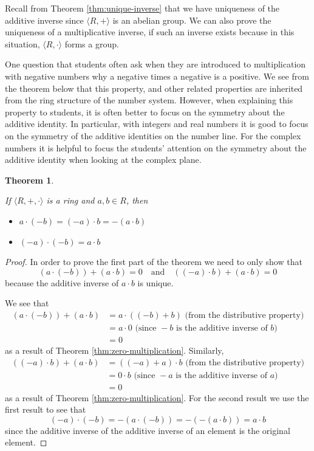 \documentclass[
]{book}
\newtheorem{theorem}{Theorem}[chapter]
\theoremstyle{definition}
\theoremstyle{definition}
\theoremstyle{definition}
\theoremstyle{definition}
\theoremstyle{remark}
\begin{document}
Recall from Theorem \ref{thm:unique-inverse} that we have uniqueness of the additive inverse since \(\langle R,+\rangle\) is an abelian group. We can also prove the uniqueness of a multiplicative inverse, if such an inverse exists because in this situation, \(\langle R,\cdot \rangle\) forms a group.

One question that students often ask when they are introduced to multiplication with negative numbers why a negative times a negative is a positive. We see from the theorem below that this property, and other related properties are inherited from the ring structure of the number system. However, when explaining this property to students, it is often better to focus on the symmetry about the additive identity. In particular, with integers and real numbers it is good to focus on the symmetry of the additive identities on the number line. For the complex numbers it is helpful to focus the students' attention on the symmetry about the additive identity when looking at the complex plane.

\begin{theorem}
\protect\hypertarget{thm:unlabeled-div-96}{}\label{thm:unlabeled-div-96}

If \(\langle R,+,\cdot\rangle\) is a ring and \(a,b \in R\), then

\begin{itemize}
\item
  \(a\cdot (-b)=(-a)\cdot b=-(a\cdot b)\)
\item
  \((-a)\cdot (-b)=a\cdot b\)
\end{itemize}

\end{theorem}

\begin{proof}

In order to prove the first part of the theorem we need to only show that
\[\left( a \cdot (-b) \right) + \left(a \cdot b\right) =0 \quad \mbox{and} \quad \left((-a)\cdot b\right)+\left(a \cdot b\right) =0\] because the additive inverse of \(a\cdot b\) is unique.

We see that
\begin{align*}
(a \cdot (-b)) + (a \cdot b ) &= a \cdot ((-b)+b) \mbox{ (from the distributive property)} \\
&= a \cdot 0 \mbox{ (since } -b \mbox{ is the additive inverse of }b)\\
&= 0
\end{align*}
as a result of Theorem \ref{thm:zero-multiplication}.
Similarly,
\begin{align*}
( (-a) \cdot b) + (a \cdot b) &= ((-a)+a)\cdot b \mbox{ (from the distributive property)} \\
&= 0 \cdot b \mbox{ (since } -a \mbox{ is the additive inverse of } a)\\
&= 0
\end{align*}
as a result of Theorem \ref{thm:zero-multiplication}.
For the second result we use the first result to see that
\[(-a)\cdot (-b) = -\left(a \cdot (-b)\right) = - \left( - \left(a\cdot b\right) \right) = a \cdot b\] since the additive inverse of the additive inverse of an element is the original element.

\end{proof}
\end{document}
